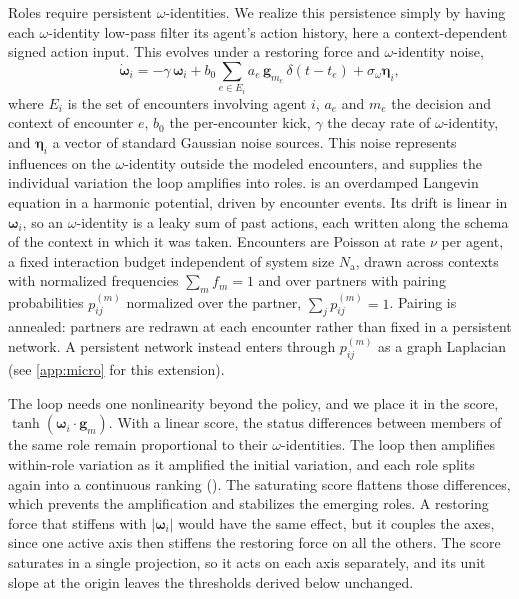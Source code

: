 \documentclass[
  aps,prx,
  reprint,
  superscriptaddress,
  nofootinbib,
  longbibliography
]{revtex4-2}
\newcommand{\w}{\bm{\omega}}
\newcommand{\g}{\mathbf{g}}
\newcommand{\sidn}{\sigma_{\omega}}
\newcommand{\Nag}{N_{\mathrm{a}}}
\newcommand{\smref}[1]{\cite[Sec.~#1]{SM}}
\begin{document}
Roles require persistent $\omega$-identities. We realize this persistence simply by having each $\omega$-identity low-pass filter its agent's action history, here a context-dependent signed action input. This evolves under a restoring force and $\omega$-identity noise,
\begin{equation}
\dot{\w}_i = -\gamma\,\w_i + b_0\!\sum_{e\in E_i} a_e\,\g_{m_e}\,\delta(t-t_e) + \sidn\bm{\eta}_i ,
\label{eq:agent}
\end{equation}
where $E_i$ is the set of encounters involving agent $i$, $a_e$ and $m_e$ the decision and context of encounter $e$, $b_0$ the per-encounter kick, $\gamma$ the decay rate of $\omega$-identity, and $\bm{\eta}_i$ a vector of standard Gaussian noise sources. This noise represents influences on the $\omega$-identity outside the modeled encounters, and supplies the individual variation the loop amplifies into roles.  is an overdamped Langevin equation in a harmonic potential, driven by encounter events. Its drift is linear in $\w_i$, so an $\omega$-identity is a leaky sum of past actions, each written along the schema of the context in which it was taken. Encounters are Poisson at rate $\nu$ per agent, a fixed interaction budget independent of system size $\Nag$, drawn across contexts with normalized frequencies $\sum_m f_m=1$ and over partners with pairing probabilities $p^{(m)}_{ij}$ normalized over the partner, $\sum_j p^{(m)}_{ij}=1$. Pairing is annealed: partners are redrawn at each encounter rather than fixed in a persistent network. A persistent network instead enters through $p^{(m)}_{ij}$ as a graph Laplacian (see \cref{app:micro} for this extension).

The loop needs one nonlinearity beyond the policy, and we place it in the score, $\tanh(\w_i\cdot\g_m)$. With a linear score, the status differences between members of the same role remain proportional to their $\omega$-identities. The loop then amplifies within-role variation as it amplified the initial variation, and each role splits again into a continuous ranking (\smref{S6}). The saturating score flattens those differences, which prevents the amplification and stabilizes the emerging roles. A restoring force that stiffens with $|\w_i|$ would have the same effect, but it couples the axes, since one active axis then stiffens the restoring force on all the others. The score saturates in a single projection, so it acts on each axis separately, and its unit slope at the origin leaves the thresholds derived below unchanged.
\end{document}
